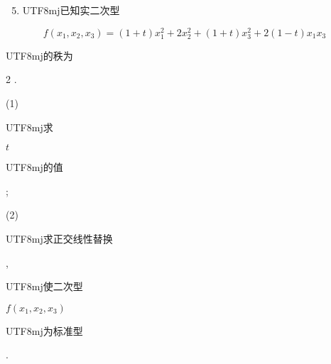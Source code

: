 \documentclass[10pt]{article}
\begin{document}
\begin{enumerate}
  \setcounter{enumi}{4}
  \item \begin{CJK}{UTF8}{mj}已知实二次型\end{CJK}
\end{enumerate}
$$
f\left(x_{1}, x_{2}, x_{3}\right)=(1+t) x_{1}^{2}+2 x_{2}^{2}+(1+t) x_{3}^{2}+2(1-t) x_{1} x_{3}
$$
\begin{CJK}{UTF8}{mj}的秩为\end{CJK} 2 .

(1) \begin{CJK}{UTF8}{mj}求\end{CJK} $t$ \begin{CJK}{UTF8}{mj}的值\end{CJK};

(2) \begin{CJK}{UTF8}{mj}求正交线性替换\end{CJK}, \begin{CJK}{UTF8}{mj}使二次型\end{CJK} $f\left(x_{1}, x_{2}, x_{3}\right)$ \begin{CJK}{UTF8}{mj}为标准型\end{CJK}.
\end{document}
